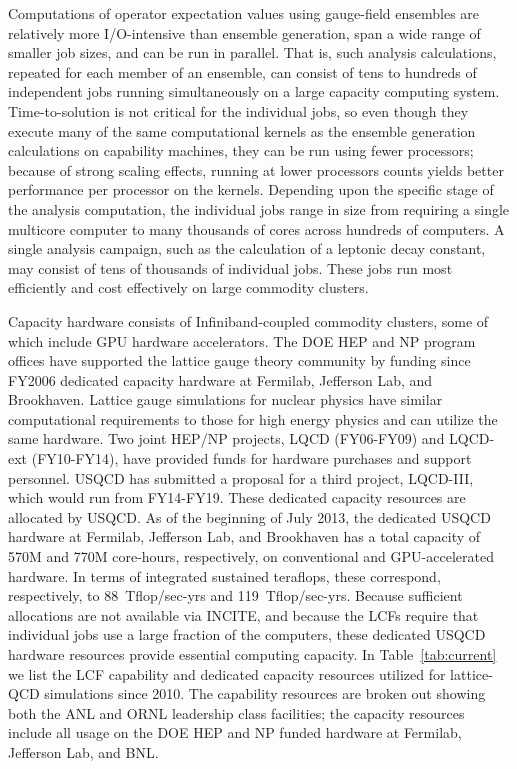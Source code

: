 Computations of operator expectation values using gauge-field ensembles are
relatively more I/O-intensive than ensemble generation, span a wide range of
smaller job sizes, and can be run in parallel.  That is, such analysis
calculations, repeated for each member of an ensemble, can consist of tens to
hundreds of independent jobs running simultaneously on a large capacity
computing system.  Time-to-solution is not critical for the individual jobs,
so even though they execute many of the same computational kernels as the
ensemble generation calculations on capability machines, they can be run using
fewer processors; because of strong scaling effects, running at lower
processors counts yields better performance per processor on the kernels.
Depending upon the specific stage of the analysis computation, the individual
jobs range in size from requiring a single multicore computer to many
thousands of cores across hundreds of computers.  A single analysis campaign,
such as the calculation of a leptonic decay constant, may consist of tens of
thousands of individual jobs.  These jobs run most efficiently and cost
effectively on large commodity clusters.

Capacity hardware consists of Infiniband-coupled commodity clusters, some of
which include GPU hardware
accelerators.  The DOE HEP and NP program offices have supported the lattice
gauge theory community by funding since FY2006 dedicated capacity hardware at
Fermilab, Jefferson Lab, and Brookhaven.  Lattice gauge simulations for
nuclear physics have similar computational requirements to those for high
energy physics and can utilize the same hardware.  Two joint HEP/NP projects,
LQCD (FY06-FY09) and LQCD-ext (FY10-FY14), have provided funds for hardware
purchases and support personnel.  USQCD has submitted a proposal for a third
project, LQCD-III, which would run from FY14-FY19.  These dedicated capacity
resources are allocated by USQCD.  As of the beginning of July 2013, the
dedicated USQCD hardware at Fermilab, Jefferson Lab, and Brookhaven has a
total capacity of 570M and 770M core-hours, respectively, on conventional and
GPU-accelerated hardware.  In terms of integrated sustained teraflops, these
correspond, respectively, to 88~Tflop/sec-yrs and 119~Tflop/sec-yrs.
Because sufficient allocations are not available via INCITE, and because the LCFs require that individual jobs use a large fraction of the computers, these dedicated
USQCD hardware resources provide essential computing capacity.
In Table~\ref{tab:current} we list the LCF capability and dedicated
capacity resources utilized for lattice-QCD simulations since 2010.
The capability resources are broken out showing both the ANL and ORNL
leadership class facilities; the capacity resources include all usage  on the 
DOE HEP and NP funded hardware at Fermilab, Jefferson Lab, and BNL.

